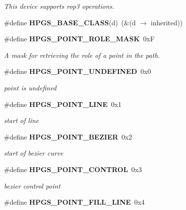 \begin{CompactItemize}
\begin{CompactList}\small\item\em This device supports rop3 operations. \item\end{CompactList}\item 
\#define \textbf{HPGS\_\-BASE\_\-CLASS}(d)~(\&(d $\rightarrow$ inherited))\label{group__device_gd40c8bf92012b37cda89ba8ee69a33a1}

\item 
\#define {\bf HPGS\_\-POINT\_\-ROLE\_\-MASK}~0xF\label{group__path_g3229deba8d3d400eb35dc5a23ffd8468}

\begin{CompactList}\small\item\em A mask for retrieving the role of a point in the path. \item\end{CompactList}\item 
\#define {\bf HPGS\_\-POINT\_\-UNDEFINED}~0x0\label{group__path_g6d0ec9ff7cda2cb9f20d2f4d915af2cd}

\begin{CompactList}\small\item\em point is undefined \item\end{CompactList}\item 
\#define {\bf HPGS\_\-POINT\_\-LINE}~0x1\label{group__path_g31b0bb74be6c5267fdae0be7bcc72a0c}

\begin{CompactList}\small\item\em start of line \item\end{CompactList}\item 
\#define {\bf HPGS\_\-POINT\_\-BEZIER}~0x2\label{group__path_g71dc1db8502694139211792a33094978}

\begin{CompactList}\small\item\em start of bezier curve \item\end{CompactList}\item 
\#define {\bf HPGS\_\-POINT\_\-CONTROL}~0x3\label{group__path_g197617cc3e882301564d69bda1600cdc}

\begin{CompactList}\small\item\em bezier control point \item\end{CompactList}\item 
\#define {\bf HPGS\_\-POINT\_\-FILL\_\-LINE}~0x4\label{group__path_g0f1ad714cd387f5808fd99fb26a145cc}


\end{CompactItemize}
